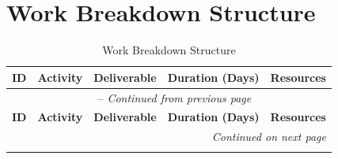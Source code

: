 \section{Work Breakdown Structure}
\begin{longtable}{|c|m{4cm}|m{4cm}|>{\centering}m{1.6cm}|m{3.5cm}|}
	\caption{Work Breakdown Structure}
	\label{table:primary} \\
	\hline \textbf{ID} & \textbf{Activity} & \textbf{Deliverable} & \textbf{Duration (Days)} & \textbf{Resources} \\ \hline
	\endfirsthead
	\multicolumn{5}{c}{\tablename\ \thetable\ -- \textit{Continued from previous page}} \\ \hline
	\textbf{ID} & \textbf{Activity} & \textbf{Deliverable} & \textbf{Duration (Days)} & \textbf{Resources} \\ \hline
	\endhead 
	\multicolumn{5}{r}{\textit{Continued on next page}} \\
	\endfoot \hline
	\endlastfoot


\end{longtable}

